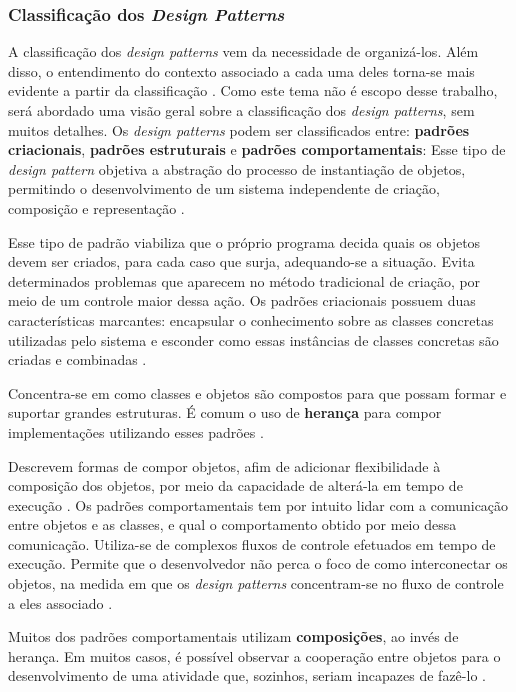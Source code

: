 \subsubsection{Classificação dos \textit{Design Patterns}}
A classificação dos \textit{design patterns} vem da necessidade de organizá-los. Além disso, o entendimento do contexto associado a cada uma deles torna-se mais evidente a partir da classificação \cite{gammaEtAl1994}. Como este tema não é escopo desse trabalho, será abordado uma visão geral sobre a classificação dos \textit{design patterns}, sem muitos detalhes. Os \textit{design patterns} podem ser classificados entre: \textbf{padrões criacionais}, \textbf{padrões estruturais} e \textbf{padrões comportamentais}:
Esse tipo de \textit{design pattern} objetiva a abstração do processo de instantiação de objetos, permitindo o desenvolvimento de um sistema independente de criação, composição e representação \cite{gammaEtAl1994}.
\par
\indent Esse tipo de padrão viabiliza que o próprio programa decida quais os objetos devem ser criados, para cada caso que surja, adequando-se a situação. Evita determinados problemas que aparecem no método tradicional de criação, por meio de um controle maior dessa ação. Os padrões criacionais possuem duas características marcantes: encapsular o conhecimento sobre as classes concretas utilizadas pelo sistema e esconder como essas instâncias de classes concretas são criadas e combinadas \cite{gammaEtAl1994}.
\par
\indent Concentra-se em como classes e objetos são compostos para que possam formar e suportar grandes estruturas. É comum o uso de \textbf{herança} para compor implementações utilizando esses padrões \cite{gammaEtAl1994}.
\par
\indent Descrevem formas de compor objetos, afim de adicionar flexibilidade à composição dos objetos, por meio da capacidade de alterá-la em tempo de execução \cite{gammaEtAl1994}.
Os padrões comportamentais tem por intuito lidar com a comunicação entre objetos e as classes, e qual o comportamento obtido por meio dessa comunicação. Utiliza-se de complexos fluxos de controle efetuados em tempo de execução. Permite que o desenvolvedor não perca o foco de como interconectar os objetos, na medida em que os \textit{design patterns} concentram-se no fluxo de controle a eles associado \cite{gammaEtAl1994}.
\par
\indent Muitos dos padrões comportamentais utilizam \textbf{composições}, ao invés de herança. Em muitos casos, é possível observar a cooperação entre objetos para o desenvolvimento de uma atividade que, sozinhos, seriam incapazes de fazê-lo \cite{gammaEtAl1994}.

